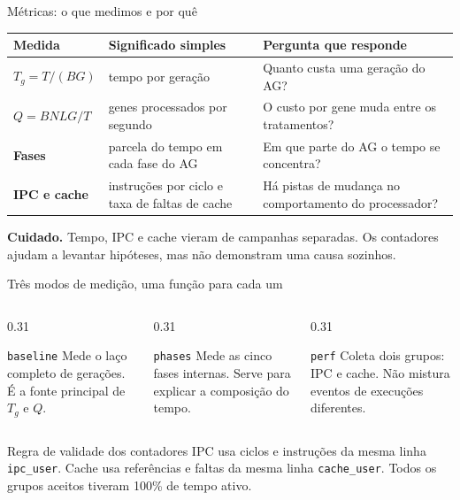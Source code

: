 \documentclass[aspectratio=169,11pt]{beamer}
\begin{document}
\begin{frame}{Métricas: o que medimos e por quê}
    \small
    \renewcommand{\arraystretch}{1.16}
    \begin{tabularx}{\textwidth}{>{\bfseries}p{} p{} X}
        Medida & Significado simples & Pergunta que responde \\
        \hline
        $T_g=T/(BG)$ & tempo por geração & Quanto custa uma geração do AG? \\
        \hline
        $Q=BNLG/T$ & genes processados por segundo & O custo por gene muda entre os tratamentos? \\
        \hline
        Fases & parcela do tempo em cada fase do AG & Em que parte do AG o tempo se concentra? \\
        \hline
        IPC e cache & instruções por ciclo e taxa de faltas de cache & Há pistas de mudança no comportamento do processador? \\
    \end{tabularx}
    \vspace{0.14cm}
    \footnotesize\textcolor{alertred}{\textbf{Cuidado.}} Tempo, IPC e cache vieram de campanhas
    separadas. Os contadores ajudam a levantar hipóteses, mas não demonstram uma causa sozinhos.
\end{frame}

\begin{frame}{Três modos de medição, uma função para cada um}
    \begin{columns}[T,onlytextwidth]
        \begin{column}{0.31\textwidth}
            \begin{questionbox}{\texttt{baseline}}
                Mede o laço completo de gerações. É a fonte principal de $T_g$ e $Q$.
            \end{questionbox}
        \end{column}
        \begin{column}{0.31\textwidth}
            \begin{questionbox}{\texttt{phases}}
                Mede as cinco fases internas. Serve para explicar a composição do tempo.
            \end{questionbox}
        \end{column}
        \begin{column}{0.31\textwidth}
            \begin{questionbox}{\texttt{perf}}
                Coleta dois grupos: IPC e cache. Não mistura eventos de execuções diferentes.
            \end{questionbox}
        \end{column}
    \end{columns}
    \vspace{0.32cm}
    \begin{impactbox}{Regra de validade dos contadores}
        IPC usa ciclos e instruções da mesma linha \texttt{ipc\_user}. Cache usa referências
        e faltas da mesma linha \texttt{cache\_user}. Todos os grupos aceitos tiveram 100\% de tempo ativo.
    \end{impactbox}
\end{frame}
\end{document}
